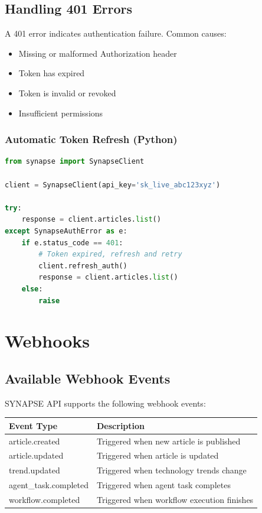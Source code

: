 \documentclass{report}
\begin{document}
\section{Handling 401 Errors}

A 401 error indicates authentication failure. Common causes:

\begin{itemize}
    \item Missing or malformed Authorization header
    \item Token has expired
    \item Token is invalid or revoked
    \item Insufficient permissions
\end{itemize}

\subsection{Automatic Token Refresh (Python)}

\begin{lstlisting}[language=Python]
from synapse import SynapseClient

client = SynapseClient(api_key='sk_live_abc123xyz')

try:
    response = client.articles.list()
except SynapseAuthError as e:
    if e.status_code == 401:
        # Token expired, refresh and retry
        client.refresh_auth()
        response = client.articles.list()
    else:
        raise
\end{lstlisting}

\chapter{Webhooks}

\section{Available Webhook Events}

SYNAPSE API supports the following webhook events:

\begin{center}
\begin{tabular}{ll}
\toprule
\textbf{Event Type} & \textbf{Description} \\
\midrule
article.created & Triggered when new article is published \\
article.updated & Triggered when article is updated \\
trend.updated & Triggered when technology trends change \\
agent\_task.completed & Triggered when agent task completes \\
workflow.completed & Triggered when workflow execution finishes \\
\bottomrule
\end{tabular}
\end{center}
\end{document}
